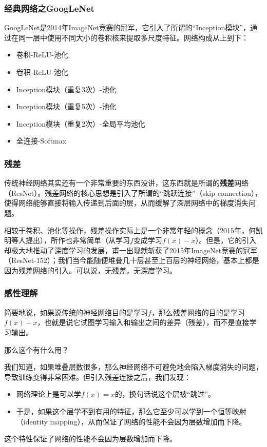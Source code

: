 \documentclass[fontset=none]{ctexbeamer}
\begin{document}
\begin{frame}
    \frametitle{经典网络之GoogLeNet}

    GoogLeNet是2014年ImageNet竞赛的冠军，它引入了所谓的“Inception模块”，通过在同一层中使用不同大小的卷积核来提取多尺度特征。网络构成从上到下：
\begin{itemize}
    \item 卷积-ReLU-池化
    \item 卷积-ReLU-池化
    \item Inception模块（重复3次）-池化
    \item Inception模块（重复5次）-池化
    \item Inception模块（重复2次）-全局平均池化
    \item 全连接-Softmax
\end{itemize}

\end{frame}

\begin{frame}
    \frametitle{残差}

    传统神经网络其实还有一个非常重要的东西没讲，这东西就是所谓的\textbf{残差}网络（ResNet）。残差网络的核心思想是引入了所谓的“跳跃连接”（skip connection），使得网络能够直接将输入传递到后面的层，从而缓解了深层网络中的梯度消失问题。

    相较于卷积、池化等操作，残差操作实际上是一个非常年轻的概念（2015年，何凯明等人提出），所作也非常简单（从学习$f$变成学习$f(x) - x$）。但是，它的引入却极大地推动了深度学习的发展，甫一出现就斩获了2015年ImageNet竞赛的冠军（ResNet-152）；我们当今能随便堆叠几十层甚至上百层的神经网络，基本上都是因为残差网络的引入。可以说，无残差，无深度学习。

\end{frame}

\begin{frame}
    \frametitle{感性理解}

    简要地说，如果说传统的神经网络目的是学习$f$，那么残差网络的目的是学习$f(x) - x$，也就是说它试图学习输入和输出之间的差异（残差），而不是直接学习输出。

    那么这个有什么用？

    我们知道，如果堆叠层数很多，那么神经网络不可避免地会陷入梯度消失的问题，导致训练变得非常困难。但引入残差连接之后，我们发现：
    \begin{itemize}
        \item 网络理论上是可以学$f(x)=x$的，换句话说这个层被“跳过”。
        \item 于是，如果这个层学不到有用的特征，那么它至少可以学到一个恒等映射（identity mapping），从而保证了网络的性能不会因为层数增加而下降。
    \end{itemize}
    这个特性保证了网络的性能不会因为层数增加而下降。

\end{frame}
\end{document}
